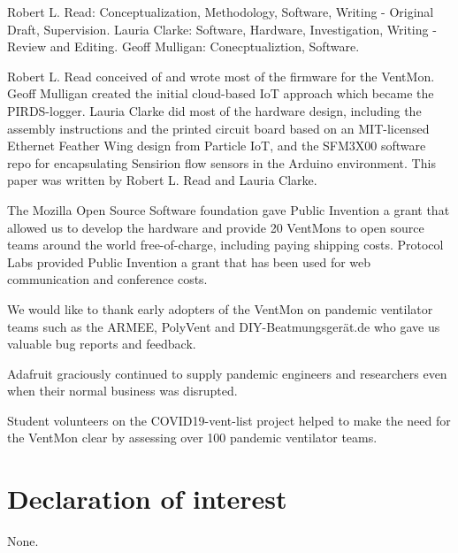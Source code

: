 \documentclass[11pt, letterpaper]{article}
\begin{document}
Robert L. Read: Conceptualization, Methodology, Software, Writing - Original Draft, Supervision.
Lauria Clarke: Software, Hardware, Investigation, Writing - Review and Editing.
Geoff Mulligan: Conecptualiztion, Software.

Robert L. Read conceived of and wrote most of the firmware for the VentMon.
Geoff Mulligan created the initial cloud-based IoT approach which became the PIRDS-logger.
Lauria Clarke did most of the hardware design, including the assembly instructions and
the printed circuit board based on an MIT-licensed Ethernet Feather Wing design
from Particle IoT\cite{particleefw}, and the SFM3X00 software repo for
encapsulating Sensirion flow sensors in the Arduino environment.
This paper was written by Robert L. Read and Lauria Clarke.

The Mozilla Open Source Software foundation gave Public Invention a grant that allowed us to develop the hardware and provide 20 VentMons to open source teams around the world free-of-charge, including paying shipping costs. Protocol Labs provided Public Invention a grant that has been used for web communication and conference costs.

We would like to thank early adopters of the VentMon on pandemic ventilator teams such as the ARMEE\cite{ARMEE}, PolyVent\cite{polyvent} and DIY-Beatmungsgerät.de\cite{beatmung} who gave us valuable bug reports and feedback.

Adafruit graciously continued to supply pandemic engineers and researchers even when their normal business was disrupted.

Student volunteers on the COVID19-vent-list project\cite{COVID19VENTLIST} helped to make the need for the VentMon clear by assessing over 100 pandemic ventilator teams.

\section{Declaration of interest}

None.
\end{document}
